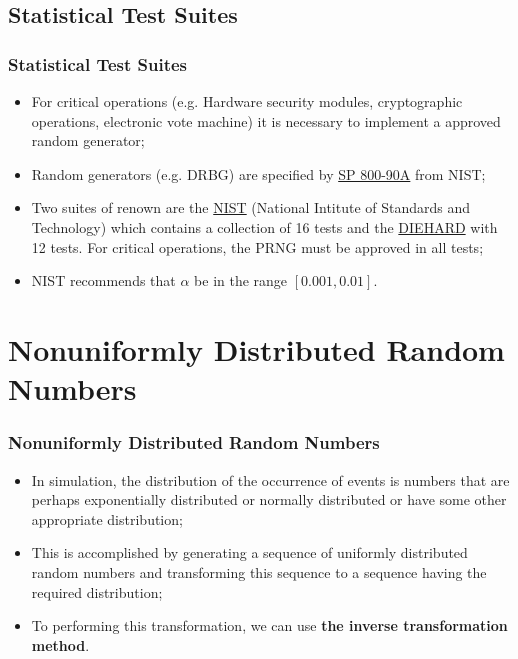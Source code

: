 \subsection{Statistical Test Suites}

\begin{frame}
    \frametitle{Statistical Test Suites}

    \begin{itemize}
       
        \item For critical operations (e.g. Hardware security modules, cryptographic operations, 
        electronic vote machine) it is necessary to implement a approved random generator;

        \item Random generators (e.g. DRBG) are specified 
        by \href{https://csrc.nist.gov/publications/detail/sp/800-90a/rev-1/final}{SP 800-90A} from NIST;

        \item Two suites of renown are the \href{https://github.com/arcetri/sts}{NIST} (National Intitute 
        of Standards and Technology) which contains a collection of 16 tests 
        and the \href{https://github.com/GINARTeam/Diehard-statistical-test}{DIEHARD} with 12 tests. For critical operations, the PRNG must be
        approved in all tests;

        \item NIST recommends that $\alpha$ be in the range $[0.001, 0.01]$.

    \end{itemize}
\end{frame}


\section{Nonuniformly Distributed Random Numbers}

\begin{frame}
    \frametitle{Nonuniformly Distributed Random Numbers}

    \begin{itemize}

        \item In simulation, the distribution of the occurrence of events
        is numbers that are perhaps exponentially distributed or normally
        distributed or have some other appropriate distribution;

        \item This is accomplished by generating a sequence of uniformly distributed 
        random numbers and transforming this sequence to a sequence having
        the required distribution;

        \item To performing this transformation, we can use \textbf{the inverse transformation
        method}.
       

    \end{itemize}
\end{frame}


